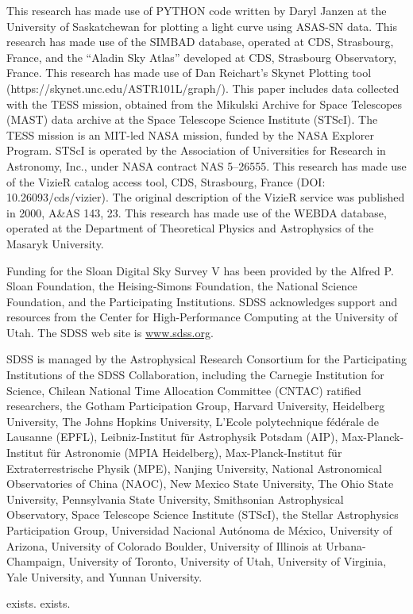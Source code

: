 \documentclass[linenumbers]{aastex631}
\begin{document}
\begin{acknowledgments}
This research has made use of PYTHON code written by Daryl Janzen at the University of Saskatchewan for plotting a light curve using ASAS-SN data.
\newline \newline
This research has made use of the SIMBAD database, operated at CDS, Strasbourg, France, and the “Aladin Sky Atlas” developed at CDS, Strasbourg Observatory, France.
\newline \newline
This research has made use of Dan Reichart's Skynet Plotting tool (https://skynet.unc.edu/ASTR101L/graph/).
\newline \newline
This paper includes data collected with the TESS mission, obtained from the Mikulski Archive for Space Telescopes (MAST) data archive at the Space Telescope Science Institute (STScI). The TESS mission is an MIT-led NASA mission, funded by the NASA Explorer Program. STScI is operated by the Association of Universities for Research in Astronomy, Inc., under NASA contract NAS 5–26555.
\newline \newline
This research has made use of the VizieR catalog access tool, CDS, Strasbourg, France (DOI: 10.26093/cds/vizier). The original description of the VizieR service was published in 2000, A\&AS 143, 23.
\newline \newline
This research has made use of the WEBDA database, operated at the Department of Theoretical Physics and Astrophysics of the Masaryk University. 

Funding for the Sloan Digital Sky Survey V has been provided by the Alfred P. Sloan Foundation, the Heising-Simons Foundation, the National Science Foundation, and the Participating Institutions. SDSS acknowledges support and resources from the Center for High-Performance Computing at the University of Utah. The SDSS web site is \url{www.sdss.org}.

SDSS is managed by the Astrophysical Research Consortium for the Participating Institutions of the SDSS Collaboration, including the Carnegie Institution for Science, Chilean National Time Allocation Committee (CNTAC) ratified researchers, the Gotham Participation Group, Harvard University, Heidelberg University, The Johns Hopkins University, L’Ecole polytechnique fédérale de Lausanne (EPFL), Leibniz-Institut für Astrophysik Potsdam (AIP), Max-Planck-Institut für Astronomie (MPIA Heidelberg), Max-Planck-Institut für Extraterrestrische Physik (MPE), Nanjing University, National Astronomical Observatories of China (NAOC), New Mexico State University, The Ohio State University, Pennsylvania State University, Smithsonian Astrophysical Observatory, Space Telescope Science Institute (STScI), the Stellar Astrophysics Participation Group, Universidad Nacional Autónoma de México, University of Arizona, University of Colorado Boulder, University of Illinois at Urbana-Champaign, University of Toronto, University of Utah, University of Virginia, Yale University, and Yunnan University.

\citep{vsp} exists.
\citep{SDSS} exists.

\end{acknowledgments}
\end{document}
